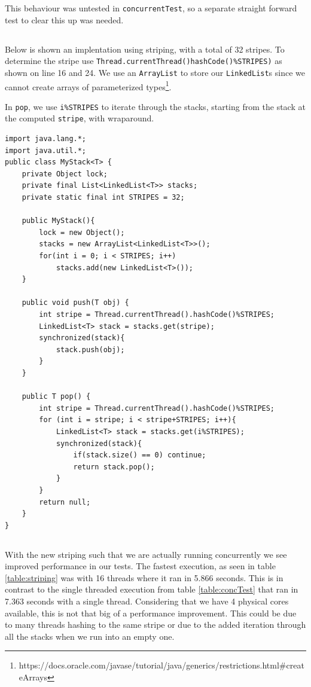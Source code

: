 \documentclass[a5paper]{article}
\begin{document}
This behaviour was untested in \texttt{concurrentTest}, so a separate straight forward test to clear this up was needed.

\subsection{}\label{sec:striping}
Below is shown an implentation using striping, with a total of 32 stripes. To determine the stripe use \texttt{Thread.currentThread()hashCode()\%STRIPES)}
as shown on line 16 and 24. We use an \texttt{ArrayList} to store our \texttt{LinkedList}s since we cannot create arrays of 
parameterized types\footnote{https://docs.oracle.com/javase/tutorial/java/generics/restrictions.html\#createArrays}.

In \texttt{pop}, we use \texttt{i\%STRIPES} to iterate through the stacks, starting from the stack at the computed \texttt{stripe}, with wraparound.

\begin{lstlisting}
import java.lang.*;
import java.util.*;
public class MyStack<T> {
    private Object lock;
    private final List<LinkedList<T>> stacks;
    private static final int STRIPES = 32;

    public MyStack(){
        lock = new Object();
        stacks = new ArrayList<LinkedList<T>>();
        for(int i = 0; i < STRIPES; i++)
            stacks.add(new LinkedList<T>());
    }

    public void push(T obj) {
        int stripe = Thread.currentThread().hashCode()%STRIPES;
        LinkedList<T> stack = stacks.get(stripe);
        synchronized(stack){
            stack.push(obj);
        }
    }

    public T pop() {
        int stripe = Thread.currentThread().hashCode()%STRIPES;
        for (int i = stripe; i < stripe+STRIPES; i++){
            LinkedList<T> stack = stacks.get(i%STRIPES);
            synchronized(stack){
                if(stack.size() == 0) continue;
                return stack.pop();
            }
        }
        return null;
    }
}
\end{lstlisting}

\subsection{}
With the new striping such that we are actually running concurrently we see improved performance in our tests.
The fastest execution, as seen in table \ref{table:striping} was with 16 threads where it ran in 5.866 seconds. This is in contrast
to the single threaded execution from table \ref{table:concTest} that ran in 7.363 seconds with a single thread. Considering that we have
4 physical cores available, this is not that big of a performance improvement. This could be due to many threads hashing to the same stripe or
due to the added iteration through all the stacks when we run into an empty one.
\end{document}
